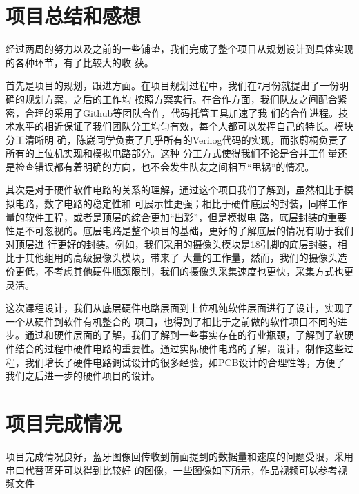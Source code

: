 \documentclass[a4paper]{paper}
\begin{document}
\section{项目总结和感想}
经过两周的努力以及之前的一些铺垫，我们完成了整个项目从规划设计到具体实现的各种环节，有了比较大的收
获。

首先是项目的规划，跟进方面。在项目规划过程中，我们在7月份就提出了一份明确的规划方案，之后的工作均
按照方案实行。在合作方面，我们队友之间配合紧密，合理的采用了Github等团队合作，代码托管工具加速了我
们的合作进程。技术水平的相近保证了我们团队分工均匀有效，每个人都可以发挥自己的特长。模块分工清晰明
确，陈崴同学负责了几乎所有的Verilog代码的实现，而张蔚桐负责了所有的上位机实现和模拟电路部分。这种
分工方式使得我们不论是合并工作量还是检查错误都有着明确的方向，也不会发生队友之间相互“甩锅”的情况。

其次是对于硬件软件电路的关系的理解，通过这个项目我们了解到，虽然相比于模拟电路，数字电路的稳定性和
可展示性更强；相比于硬件底层的封装，同样工作量的软件工程，或者是顶层的综合更加“出彩”，但是模拟电
路，底层封装的重要性是不可忽视的。底层电路是整个项目的基础，更好的了解底层的情况有助于我们对顶层进
行更好的封装。例如，我们采用的摄像头模块是18引脚的底层封装，相比于其他组用的高级摄像头模块，带来了
大量的工作量，然而，我们的摄像头造价更低，不考虑其他硬件瓶颈限制，我们的摄像头采集速度也更快，采集方式也更灵活。

这次课程设计，我们从底层硬件电路层面到上位机纯软件层面进行了设计，实现了一个从硬件到软件有机整合的
项目，也得到了相比于之前做的软件项目不同的进步。通过和硬件层面的了解，我们了解到一些事实存在的行业瓶颈，了解到了软硬件结合的过程中硬件电路的重要性。通过实际硬件电路的了解，设计，制作这些过程，我们增长了硬件电路调试设计的很多经验，如PCB设计的合理性等，方便了我们之后进一步的硬件项目的设计。
\section{项目完成情况}
项目完成情况良好，蓝牙图像回传收到前面提到的数据量和速度的问题受限，采用串口代替蓝牙可以得到比较好
的图像，一些图像如下所示，作品视频可以参考\href{final.mp4}{\underline{视频文件}}
\end{document}
